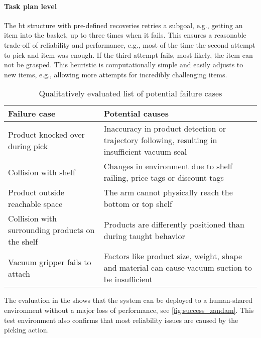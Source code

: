 \paragraph{Task plan level} The \ac{bt} structure with pre-defined recoveries retries a subgoal, e.g., getting an item into the basket, up to three times when it fails. This ensures a reasonable trade-off of reliability and performance, e.g., most of the time the second attempt to pick and item was enough. If the third attempt fails, most likely, the item can not be grasped. This heuristic is computationally simple and easily adjusts to new items, e.g., allowing more attempts for incredibly challenging items.
\begin{table*}[t]
    \centering
    \begin{tabular}{p{5.5cm}p{11cm}}
        \toprule
        Failure case & Potential causes \\
        \midrule
        Product knocked over during pick & Inaccuracy in product detection or trajectory following, resulting in insufficient vacuum seal \\
        Collision with shelf & Changes in environment due to shelf railing, price tags or discount tags \\
        Product outside reachable space  & The arm cannot physically reach the bottom or top shelf \\
        Collision with surrounding products on the shelf & Products are differently positioned than during taught behavior \\
        Vacuum gripper fails to attach & Factors like product size, weight, shape and material can cause vacuum suction to be insufficient \\
        \bottomrule
    \end{tabular}
    \caption{Qualitatively evaluated list of potential failure cases}
    \label{tab:failure_cases}
\end{table*}


The evaluation in the \realsupermarket{} shows that the system
can be deployed to a human-shared environment without a major loss of performance, see
\cref{fig:success_zandam}. This test environment also
confirms that most reliability issues are caused by the
picking action.








